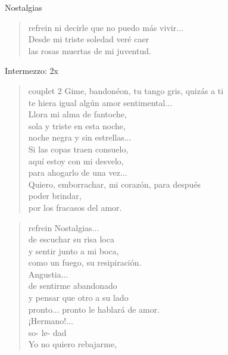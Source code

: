 \begin{song}{Nostalgias}
\begin{verse}{refrein}
ni decirle que no puedo más vivir...\\
Desde mi triste soledad veré caer\\
las rosas muertas de mi juventud.
\end{verse}
\begin{instrumental}{Intermezzo:}
 2x
\end{instrumental}
\begin{verse}{couplet 2}
	Gime, bandonéon, tu tango gris, quizás a ti\\
te hiera igual algún amor sentimental...\\
	Llora mi alma de fantoche,\\
	sola y triste en esta noche,\\
	noche negra y sin estrellas...\\
	Si las copas traen consuelo,\\
	aquí estoy con mi desvelo,\\
	para ahogarlo de  una vez...\hspace{2em} \\
	Quiero, emborrachar, mi corazón, para después\\
	poder brindar,\\
por los fracasos del amor.
\end{verse}
\begin{verse}{refrein}
	Nostalgias...\\
	de escuchar su risa loca\\
	y sentir junto a mi boca,\\
	como un fuego, su resipiración.\\
	Angustia...\\
	\chord{---}de sentirme abandonado\\
	y pensar que otro a su lado\\
	pronto... pronto le hablará de amor.\\
	¡Hermano!...   \chord{---}\\
	\hspace*{2.8em} so- le- dad\\
	Yo no quiero rebajarme,\\

\end{verse}
\end{song}
